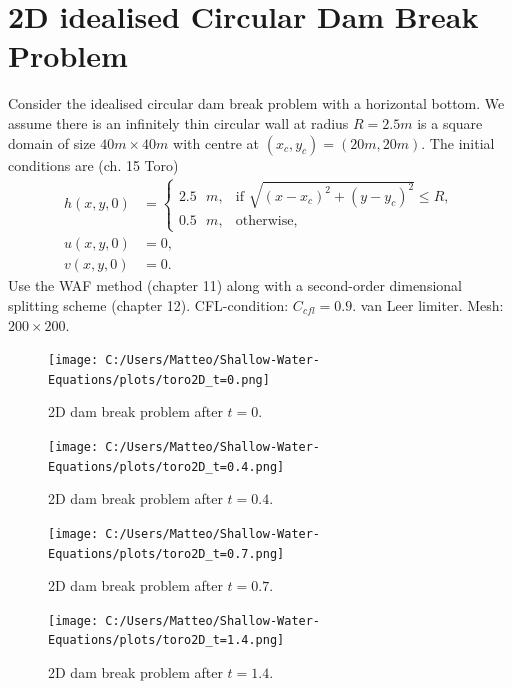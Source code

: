 \section{2D idealised Circular Dam Break Problem}
Consider the idealised circular dam break problem with a horizontal bottom.
We assume there is an infinitely thin circular wall at radius $R = 2.5 m$ is a square domain of size $40 m \times 40 m$ with centre at $(x_c,y_c) = (20 m, 20 m)$.
The initial conditions are (ch. 15 Toro)
\begin{align*}
    h(x,y,0) &= \begin{cases}
        2.5 \text{ }m, & \text{if } \sqrt{ {(x-x_c)}^2 + {(y-y_c)}^2 } \leq R, \\
        0.5 \text{ }m, & \text{otherwise},
    \end{cases} \\
    u(x,y,0) &= 0, \\
    v(x,y,0) &= 0.
\end{align*}
Use the WAF method (chapter 11) along with a second-order dimensional splitting scheme (chapter 12).
CFL-condition: $C_{cfl} = 0.9$.
van Leer limiter. Mesh: $200 \times 200$.

\begin{figure}[H]
    \centering
    \texttt{[image: C:/Users/Matteo/Shallow-Water-Equations/plots/toro2D\_t=0.png]}
    \caption{2D dam break problem after $t=0$.}\label{fig:2D_dam_break_t0}
\end{figure}

\begin{figure}[H]
    \centering
    \texttt{[image: C:/Users/Matteo/Shallow-Water-Equations/plots/toro2D\_t=0.4.png]}
    \caption{2D dam break problem after $t=0.4$.}\label{fig:2D_dam_break_t0.4}
\end{figure}

\begin{figure}[H]
    \centering
    \texttt{[image: C:/Users/Matteo/Shallow-Water-Equations/plots/toro2D\_t=0.7.png]}
    \caption{2D dam break problem after $t=0.7$.}\label{fig:2D_dam_break_t0.7}
\end{figure}

\begin{figure}[H]
    \centering
    \texttt{[image: C:/Users/Matteo/Shallow-Water-Equations/plots/toro2D\_t=1.4.png]}
    \caption{2D dam break problem after $t=1.4$.}\label{fig:2D_dam_break_t1.4}
\end{figure}




